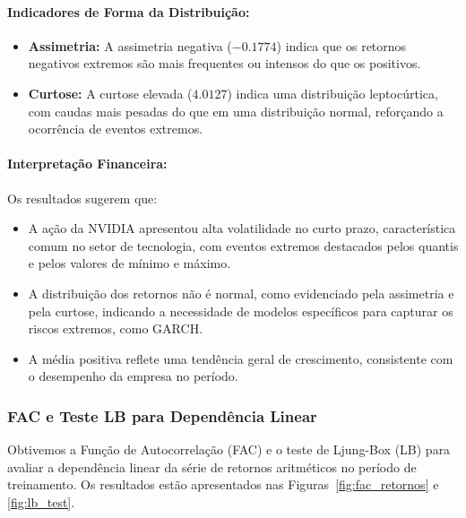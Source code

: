 \documentclass[a4paper, 12pt]{article}
\begin{document}
\paragraph{Indicadores de Forma da Distribuição:}
\begin{itemize}
    \item \textbf{Assimetria:} A assimetria negativa (\(-0.1774\)) indica que os retornos negativos extremos são mais frequentes ou intensos do que os positivos.
    \item \textbf{Curtose:} A curtose elevada (\(4.0127\)) indica uma distribuição leptocúrtica, com caudas mais pesadas do que em uma distribuição normal, reforçando a ocorrência de eventos extremos.
\end{itemize}

\paragraph{Interpretação Financeira:}

Os resultados sugerem que:
\begin{itemize}
    \item A ação da NVIDIA apresentou alta volatilidade no curto prazo, característica comum no setor de tecnologia, com eventos extremos destacados pelos quantis e pelos valores de mínimo e máximo.
    \item A distribuição dos retornos não é normal, como evidenciado pela assimetria e pela curtose, indicando a necessidade de modelos específicos para capturar os riscos extremos, como GARCH.
    \item A média positiva reflete uma tendência geral de crescimento, consistente com o desempenho da empresa no período.
\end{itemize}


\subsubsection{FAC e Teste LB para Dependência Linear}
Obtivemos a Função de Autocorrelação (FAC) e o teste de Ljung-Box (LB) para avaliar a dependência linear da série de retornos aritméticos no período de treinamento. Os resultados estão apresentados nas Figuras~\ref{fig:fac_retornos} e \ref{fig:lb_test}.
\end{document}
